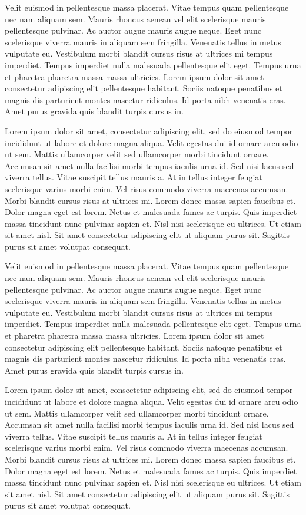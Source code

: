 \documentclass[draft]{G7-32-2017}
\begin{document}
Velit euismod in pellentesque massa placerat. Vitae tempus quam pellentesque nec nam aliquam sem. Mauris rhoncus aenean vel elit scelerisque mauris pellentesque pulvinar. Ac auctor augue mauris augue neque. Eget nunc scelerisque viverra mauris in aliquam sem fringilla. Venenatis tellus in metus vulputate eu. Vestibulum morbi blandit cursus risus at ultrices mi tempus imperdiet. Tempus imperdiet nulla malesuada pellentesque elit eget. Tempus urna et pharetra pharetra massa massa ultricies. Lorem ipsum dolor sit amet consectetur adipiscing elit pellentesque habitant. Sociis natoque penatibus et magnis dis parturient montes nascetur ridiculus. Id porta nibh venenatis cras. Amet purus gravida quis blandit turpis cursus in.

Lorem ipsum dolor sit amet, consectetur adipiscing elit, sed do eiusmod tempor incididunt ut labore et dolore magna aliqua. Velit egestas dui id ornare arcu odio ut sem. Mattis ullamcorper velit sed ullamcorper morbi tincidunt ornare. Accumsan sit amet nulla facilisi morbi tempus iaculis urna id. Sed nisi lacus sed viverra tellus. Vitae suscipit tellus mauris a. At in tellus integer feugiat scelerisque varius morbi enim. Vel risus commodo viverra maecenas accumsan. Morbi blandit cursus risus at ultrices mi. Lorem donec massa sapien faucibus et. Dolor magna eget est lorem. Netus et malesuada fames ac turpis. Quis imperdiet massa tincidunt nunc pulvinar sapien et. Nisl nisi scelerisque eu ultrices. Ut etiam sit amet nisl. Sit amet consectetur adipiscing elit ut aliquam purus sit. Sagittis purus sit amet volutpat consequat.

Velit euismod in pellentesque massa placerat. Vitae tempus quam pellentesque nec nam aliquam sem. Mauris rhoncus aenean vel elit scelerisque mauris pellentesque pulvinar. Ac auctor augue mauris augue neque. Eget nunc scelerisque viverra mauris in aliquam sem fringilla. Venenatis tellus in metus vulputate eu. Vestibulum morbi blandit cursus risus at ultrices mi tempus imperdiet. Tempus imperdiet nulla malesuada pellentesque elit eget. Tempus urna et pharetra pharetra massa massa ultricies. Lorem ipsum dolor sit amet consectetur adipiscing elit pellentesque habitant. Sociis natoque penatibus et magnis dis parturient montes nascetur ridiculus. Id porta nibh venenatis cras. Amet purus gravida quis blandit turpis cursus in.

Lorem ipsum dolor sit amet, consectetur adipiscing elit, sed do eiusmod tempor incididunt ut labore et dolore magna aliqua. Velit egestas dui id ornare arcu odio ut sem. Mattis ullamcorper velit sed ullamcorper morbi tincidunt ornare. Accumsan sit amet nulla facilisi morbi tempus iaculis urna id. Sed nisi lacus sed viverra tellus. Vitae suscipit tellus mauris a. At in tellus integer feugiat scelerisque varius morbi enim. Vel risus commodo viverra maecenas accumsan. Morbi blandit cursus risus at ultrices mi. Lorem donec massa sapien faucibus et. Dolor magna eget est lorem. Netus et malesuada fames ac turpis. Quis imperdiet massa tincidunt nunc pulvinar sapien et. Nisl nisi scelerisque eu ultrices. Ut etiam sit amet nisl. Sit amet consectetur adipiscing elit ut aliquam purus sit. Sagittis purus sit amet volutpat consequat.
\end{document}
